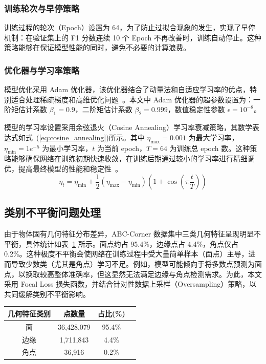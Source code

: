 \subsubsection{训练轮次与早停策略}
训练过程的轮次（Epoch）设置为 64，为了防止过拟合现象的发生，实现了早停机制：在验证集上的 F1 分数连续 10 个 Epoch 不再改善时，训练自动停止。这种策略能够在保证模型性能的同时，避免不必要的计算浪费。

\subsubsection{优化器与学习率策略}
模型优化采用 Adam 优化器，该优化器结合了动量法和自适应学习率的优点，特别适合处理稀疏梯度和高维优化问题~\cite{kingma_adam_2014}。本文中 Adam 优化器的超参数设置为：一阶矩估计系数 $\beta_1 = 0.9$，二阶矩估计系数 $\beta_2 = 0.999$，数值稳定性参数 $\epsilon = 10^{-8}$。

模型的学习率设置采用余弦退火（Cosine Annealing）学习率衰减策略，其数学表达式如式~(\ref{eq:cosine_annealing})所示。其中 $\eta_{\max} = 0.001$ 为最大学习率，$\eta_{\min} = 1e^{-5}$ 为最小学习率，$t$ 为当前 epoch，$T = 64$ 为训练总 epoch 数。这种策略能够确保网络在训练初期快速收敛，在训练后期通过较小的学习率进行精细调优，提高最终模型的性能和稳定性~\cite{loshchilov_sgdr_2017}。
\begin{equation}
    \eta_t = \eta_{\min} + \frac{1}{2}(\eta_{\max} - \eta_{\min})\left(1 + \cos\left(\pi \frac{t}{T}\right)\right)
    \label{eq:cosine_annealing}
\end{equation}


\subsection{类别不平衡问题处理}
\label{subsec:loss_function_balanced}

由于物体固有几何特征分布差异，ABC-Corner 数据集中三类几何特征呈现明显不平衡，具体统计如表~\ref{tab:class_distribution} 所示。面点约占 95.4\%，边缘点占 4.4\%，角点仅占 0.2\%。这种极度不平衡会使网络在训练过程中受大量简单样本（面点）主导，进而导致少数类（尤其是角点）学习不足。例如，模型可能倾向于将多数点预测为面点，以换取较高整体准确率，但这显然无法满足边缘与角点检测需求。为此，本文采用 Focal Loss 损失函数，并结合针对性数据上采样（Oversampling）策略，以共同缓解类别不平衡影响。

\begin{table}[!htbp]
    \centering
    \setlength{\tabcolsep}{12pt}
    \begin{tabular}{cccc}
        \toprule
        几何特征类别 & 点数量 & 占比(\%)\\
        \midrule
        面 & 36,428,079 & 95.4\% \\
        边缘 & 1,711,843 & 4.4\% \\
        角点 & 36,916 & 0.2\% \\
        \bottomrule
    \end{tabular}
    \label{tab:class_distribution}
\end{table}

